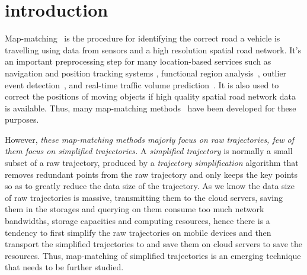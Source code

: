 

\section{introduction}
\label{sec-intro}

Map-matching~\cite{Newson2009Hidden,Wang:eddy,yin:feature-based,Hunter2013,liu:st-crf} is the procedure for identifying the correct road a vehicle is travelling using data from sensors and a high resolution spatial road network\cite{Newson2009Hidden}.
It's an important preprocessing step for many location-based services such as navigation and position tracking systems \cite{Yin:2015:Context, Yin:2015:Exploiting, Gustafsson:2002:Particle, Mohammed:2006:Fuzzy}, functional region analysis~\cite{Yuan:regions}, outlier event detection~\cite{Zhang:2012:Outlier,Chawla:2012:Anomalies}, and real-time traffic volume prediction~\cite{Jenelius:time}.
It is also used to correct the positions of moving objects if high quality spatial road network data is available\cite{Quddus2003}. Thus, many map-matching methods~\cite{Newson2009Hidden,Wang:eddy,yin:feature-based,Hunter2013,liu:st-crf} have been developed for these purposes.

However, \textit{these map-matching methods majorly focus on raw trajectories, few of them focus on {simplified trajectories}.}
A \emph{simplified trajectory} is normally a small subset of a raw trajectory, produced by a \emph{trajectory simplification} algorithm \cite{Douglas:Peucker,Meratnia:Spatiotemporal,Muckell:SQUISH,Lin:Operb,Zhang:Evaluation,Lin:Cised} that removes
redundant points from the raw trajectory and only keeps the key points so as to greatly reduce the data size of the trajectory.
As we know the data size of raw trajectories is massive, %
transmitting them to the cloud servers, saving them in the storages and querying on them consume too much network bandwidths, storage capacities and computing resources,
hence there is a tendency to first simplify the raw trajectories on mobile devices and then transport the simplified trajectories to and save them on cloud servers to save the resources.
Thus, map-matching of simplified trajectories is an emerging technique that needs to be further studied.

